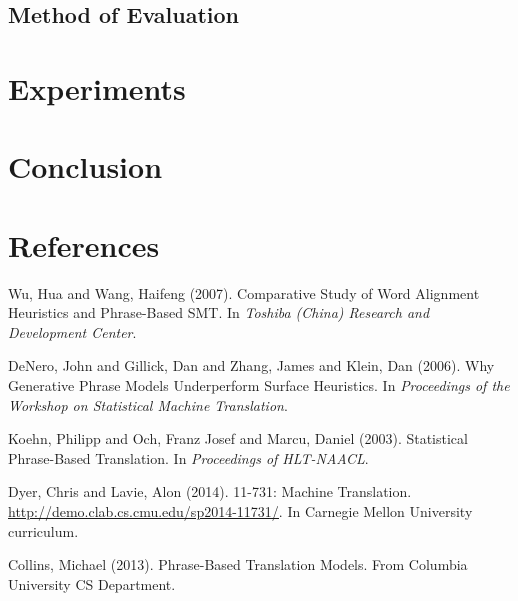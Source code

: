 \documentclass[twocolumn]{article}
\begin{document}
\subsection{Method of Evaluation}


\section{Experiments}


\section{Conclusion}


\section*{References}
\begin{thebibliography}{99}
    Wu, Hua and Wang, Haifeng
    (2007).
    Comparative Study of Word Alignment Heuristics and Phrase-Based SMT.
    In \emph{Toshiba (China) Research and
      Development Center}.

    DeNero, John and Gillick, Dan and Zhang, James and Klein, Dan
    (2006).
    Why Generative Phrase Models Underperform Surface Heuristics.
    In \emph{Proceedings of the Workshop on Statistical Machine Translation}.

    Koehn, Philipp and Och, Franz Josef and Marcu, Daniel
    (2003).
    Statistical Phrase-Based Translation.
    In \emph{Proceedings of HLT-NAACL}.

    Dyer, Chris and Lavie, Alon
    (2014).
    11-731: Machine Translation.
    \href{http://demo.clab.cs.cmu.edu/sp2014-11731/}
     {\underline{http://demo.clab.cs.cmu.edu/sp2014-11731/}}.
    In Carnegie Mellon University curriculum.

    Collins, Michael
    (2013).
    Phrase-Based Translation Models.
    From Columbia University CS Department.
\end{thebibliography}
\end{document}
